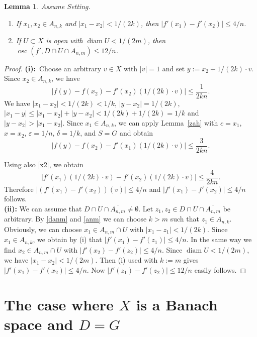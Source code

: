 \documentclass[12pt,a4paper]{amsart}
\theoremstyle{plain}
\newtheorem{lemma}[theorem]{Lemma}         %
\theoremstyle{definition}
\theoremstyle{remark}
\numberwithin{equation}{section}
\newcommand{\osc}{\operatorname{osc}}
\newcommand{\ep}{\varepsilon}
\newcommand{\diam}{\operatorname{diam}}
\begin{document}
\begin{lemma}\label{osc}
Assume Setting.
\begin{enumerate}
\item[(i)]
If  $x_1, x_2 \in A_{n,k}$ and  $|x_1-x_2|< 1/(2k)$, 
then $|f'(x_1)-f'(x_2)|\leq 4/n$.
\item[(ii)]
If $U\subset X$ is open with $\diam U< 1/(2m)$, then  
$\osc(f', D \cap U\cap \overline{A_{n,m}})  \leq 12/n$.
\end{enumerate}
\end{lemma}
\begin{proof}
{\bf (i):}\ 
Choose an arbitrary $v\in X$ with $|v|=1$ and set $y:= x_2 + 1/(2k) \cdot v$. Since  $x_2 \in A_{n,k}$,
 we have
\begin{equation}\label{x2}
|f(y)-f(x_2) - f'(x_2) ( 1/(2k) \cdot v )| \leq \frac{1}{2kn}. 
\end{equation}
  We have $|x_1-x_2|< 1/ (2k)< 1/k$,  $|y-x_2|=  1/ (2k)$, $|x_1-y| \leq |x_1-x_2| + |y-x_2|
< 1/ (2k) + 1/ (2k) = 1/k$ and $|y-x_2| > |x_1-x_2|$. Since $x_1 \in A_{n,k}$,  we  can apply
  Lemma~\ref{zah}  with $c= x_1$, $x= x_2$, $\ep=1/n$, 
$\delta= 1/k$, and $S=G$ and obtain
$$
|f(y)-f(x_2) - f'(x_1) (1/(2k) \cdot  v)| \leq  \frac{3}{2kn}.
$$

Using also \eqref{x2}, we
	 obtain 
$$
|f'(x_1) (1/(2k) \cdot v) - f'(x_2) (1/(2k)\cdot v)| \leq \frac{4}{2kn}.
$$ 
Therefore
	$|(f'(x_1)- f'(x_2)) (v)|\leq  4/n$  and $|f'(x_1)- f'(x_2)|\leq 4/n$ follows. \\
{\bf (ii):} We can assume that $D \cap U \cap \overline{A_{n,m}} \neq \emptyset$. Let 
	 $z_1, z_2 \in D \cap U \cap \overline{A_{n,m}}$ be arbitrary.    By \eqref{danm} and \eqref{anm} we can choose  $k>m$ such that $z_1\in A_{n,k}$. Obviously,
	 we can choose $x_1 \in A_{n,m} \cap U$ with $|x_1-z_1|< 1/(2k)$. Since $x_1 \in  A_{n,k}$, we obtain
	 by (i) that $|f'(x_1)-f'(z_1)| \leq 4/n$. In the same way we  find $x_2 \in A_{n,m} \cap U$
	 with $|f'(x_2)-f'(z_2)| \leq 4/n$. Since  $\diam U < 1/(2m)$, we have $|x_1-x_2|< 1/(2m) $. 
Then  (i) used with $k:=m$ gives $|f'(x_1)- f'(x_2)|\leq 4/n$. Now $|f'(z_1)-f'(z_2)|\leq  12/n$
	 easily follows.
\end{proof}

\section{The case where $X$ is a Banach space and $D=G$}
\end{document}
